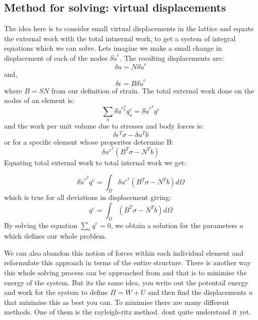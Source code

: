 \documentclass{article}
\begin{document}
\subsection{Method for solving: virtual displacements}
The idea here is to consider small virtual displacements in the lattice and equate the external work with the total intnernal work, to get a system of integral equations which we can solve.
\newline
Lets imagine we make a small change in displacement of each of the nodes $\delta \tilde{u}^{e}$. The resulting displacements are:
\begin{equation}
	\delta u = N \delta \tilde{u}^{e}
\end{equation}
 and,
\begin{equation}
	\delta \epsilon = B \delta \tilde{u}^{e}
\end{equation}
where $B = S N$ from our definition of strain.
\newline
The total external work done on the nodes of an element is:
\begin{equation}
	\sum_{a} \delta \tilde{u}^{e}^{T}_a q^{e}_{a} = \delta \tilde{u}^{e}^{T} q^{e}
\end{equation} 
and the work per unit volume due to stresses and body forces is:
\begin{equation}
	\delta \epsilon^{T} \sigma - \delta u^{T} b
\end{equation}
or for a specific element whose properites determine B:
\begin{equation}
	\delta u^{e}^{T} (B^T \sigma - N^{T} b)
\end{equation}
Equating total external work to total internal work we get:

\begin{equation}
	\delta \tilde{u}^{e}^{T} q^{e} =  \int_{\Omega} \delta u^{e}^{T} (B^T \sigma - N^{T} b) d\Omega
\end{equation}
which is true for all deviations in displacement giving:
\begin{equation}
	q^{e} =  \int_{\Omega}(B^T \sigma - N^{T} b) d\Omega
\end{equation}
By solving the equation $\sum_{e} q^{e} = 0$, we obtain a solution for the parameters $u$ which defines our whole problem.

\newline
We can also abandon this notion of forces within each individual element and reformulate this approach in terms of the entire structure. 
\newline 
There is another way this whole solving process can be approached from and that is to minimise the energy of the system. But its the same idea, you write out the potentail energy and work for the system to define $\Pi = W + U$ and then find the displacements $u$ that minimise this as best you can.
\newline
To minimise there are many different methods. One of them is the rayleigh-ritz method. dont quite understand it yet.
\end{document}
